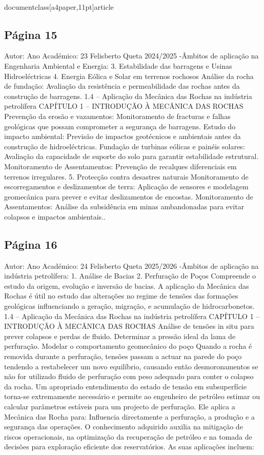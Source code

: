 \\documentclass[a4paper,11pt]{article}
\begin{document}
\subsection*{Página 15}
Autor:
Ano Académico:
23
Felisberto Queta
2024/2025
-Âmbitos de aplicação na Engenharia Ambiental e Energia:
3. Estabilidade das barragens e Usinas Hidroeléctricas
4. Energia Eólica e Solar em terrenos rochosos
Análise da rocha de fundação:
Avaliação da resistência e permeabilidade das rochas antes da construção de barragens.
1.4 – Aplicação da Mecânica das Rochas na indústria petrolífera
CAPÍTULO 1 – INTRODUÇÃO À MECÂNICA DAS ROCHAS
Prevenção da erosão e vazamentos:
Monitoramento de fracturas e falhas geológicas que possam comprometer a segurança de barragens.
Estudo do impacto ambiental:
Previsão de impactos geotécnicos e ambientais antes da construção de hidroeléctricas.
Fundação de turbinas eólicas e painéis solares:
Avaliação da capacidade de suporte do solo para garantir estabilidade estrutural.
Monitoramento de Assentamentos:
Prevenção de recalques diferenciais em terrenos irregulares.
5. Protecção contra desastres naturais
Monitoramento de escorregamentos e deslizamentos de terra:
Aplicação de sensores e modelagem geomecânica para prever e evitar deslizamentos de encostas.
Monitoramento de Assentamentos:
Análise da subsidência em minas ambandonadas para evitar colapsos e impactos ambientais..



\subsection*{Página 16}
Autor:
Ano Académico:
24
Felisberto Queta
2025/2026
-Âmbitos de aplicação na indústria petrolífera:
1. Análise de Bacias
2. Perfuração de Poços
Compreende o estudo da origem, evolução e inversão de bacias. A aplicação da Mecânica das Rochas é útil no estudo das
alterações no regime de tensões das formações geológicas influenciando a geração, migração, e acumulação de
hidrocarbonetos.
1.4 – Aplicação da Mecânica das Rochas na indústria petrolífera
CAPÍTULO 1 – INTRODUÇÃO À MECÂNICA DAS ROCHAS
Análise de tensões in situ para prever colapsos e perdas de fluido.
Determinar a pressão ideal da lama de perfuração.
Modelar o comportamento geomecânico do poço
Quando a rocha é removida durante a perfuração, tensões passam a actuar na parede do poço tendendo a restabelecer um 
novo equilíbrio, causando então desmoronamentos se não for utilizado fluido de perfuração com peso adequado para conter 
o colapso da rocha. Um apropriado entendimento do estado de tensão em subsuperfície torna-se extremamente necessário 
e permite ao engenheiro de petróleo estimar ou calcular parâmetros estáveis para um projecto de perfuração. Ele aplica a 
Mecânica das Rocha para:
Influencia directamente a perfuração, a produção e a segurança das operações. O conhecimento adquirido auxilia
na mitigação de riscos operacionais, na optimização da recuperação de petróleo e na tomada de decisões para
exploração eficiente dos reservatórios. As suas aplicações incluem:
\end{document}
